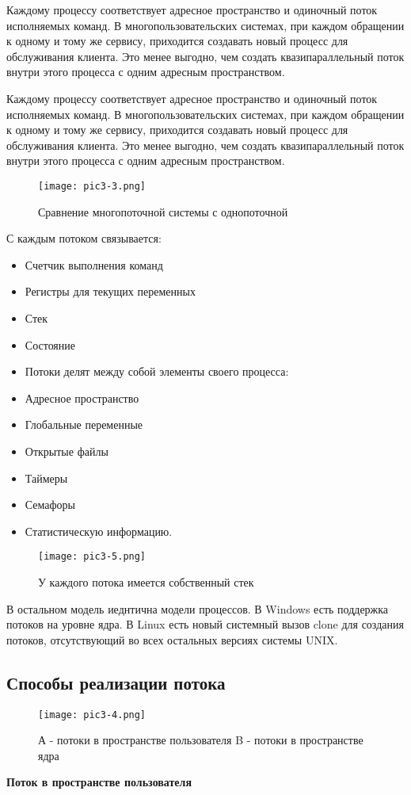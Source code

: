 Каждому процессу соответствует адресное пространство и одиночный поток исполняемых команд. В многопользовательских системах, при каждом обращении к одному и тому же сервису, приходится создавать новый процесс для обслуживания клиента. Это менее выгодно, чем создать квазипараллельный поток внутри этого процесса с одним адресным пространством.



Каждому процессу соответствует адресное пространство и одиночный поток исполняемых команд. В многопользовательских системах, при каждом обращении к одному и тому же сервису, приходится создавать новый процесс для обслуживания клиента. Это менее выгодно, чем создать квазипараллельный поток внутри этого процесса с одним адресным пространством.
\begin{figure}[!h]\center
   \texttt{[image: pic3-3.png]}
   \caption{Сравнение многопоточной системы с однопоточной}
\end{figure}

С каждым потоком связывается:
\begin{itemize}
   \item Счетчик выполнения команд
   \item Регистры для текущих переменных
   \item Стек
   \item Состояние
   \item Потоки делят между собой элементы своего процесса:
   \item Адресное пространство
   \item Глобальные переменные
   \item Открытые файлы
   \item Таймеры
   \item Семафоры
   \item Статистическую информацию.
\end{itemize}
\begin{figure}[!h]\center
   \texttt{[image: pic3-5.png]}
   \caption{У каждого потока имеется собственный стек}
\end{figure}
В остальном модель иеднтична модели процессов.
В Windows есть поддержка потоков на уровне ядра. В Linux есть новый системный вызов clone для создания потоков, отсутствующий во всех остальных версиях системы UNIX.
\newpage
\subsection{Способы реализации потока}
\begin{figure}[!h]\center
   \texttt{[image: pic3-4.png]}
   \caption{А - потоки в пространстве пользователя
      B - потоки в пространстве ядра}
\end{figure}
\textbf{Поток в пространстве пользователя}

